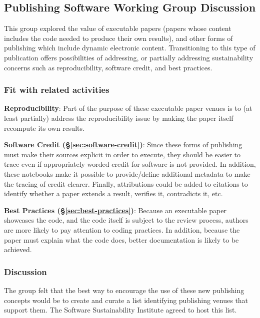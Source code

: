 \subsection{Publishing Software Working Group Discussion} \label{sec:publishing-software}

This group explored the value of executable papers (papers whose content
includes the code needed to produce their own results), and other forms of
publishing which include dynamic electronic content.
%
%
Transitioning to this type of publication offers possibilities of addressing, or
partially addressing sustainability concerns such as reproducibility, software
credit, and best practices.

\subsubsection{Fit with related activities}

\textbf{Reproducibility}: Part of the purpose of these executable paper venues
is to (at least partially) address the reproducibility issue by making the paper
itself recompute its own results.

\textbf{Software Credit (\S\ref{sec:software-credit})}: Since these forms of
publishing must make their sources explicit in order to execute, they should be
easier to trace even if appropriately worded credit for software is not
provided. In addition, these notebooks make it possible to provide/define
additional metadata to make the tracing of credit clearer. Finally, attributions
could be added to citations to identify whether a paper extends a result,
verifies it, contradicts it, etc.

\textbf{Best Practices (\S\ref{sec:best-practices})}: Because an executable
paper showcases the code, and the code itself is subject to the review process,
authors are more likely to pay attention to coding practices. In addition,
because the paper must explain what the code does, better documentation is
likely to be achieved.

\subsubsection{Discussion}

The group felt that the best way to encourage the use of these new publishing
concepts would be to create and curate a list identifying publishing venues that
support them. The Software Sustainability Institute agreed to host this list.

